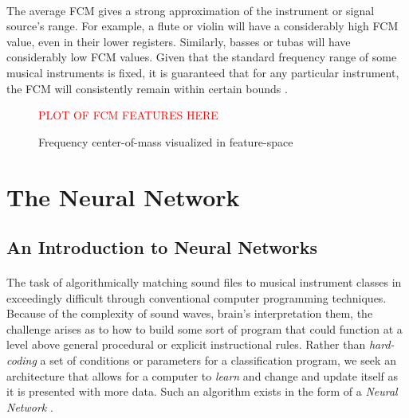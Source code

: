 \documentclass[12pt,letterpaper]{article}
\begin{document}
\paragraph*{}The average FCM gives a strong approximation of the instrument or signal source's range. For example, a flute or violin will have a considerably high FCM value, even in their lower registers. Similarly, basses or tubas will have considerably low FCM values. Given that the standard frequency range of some musical instruments is fixed, it is guaranteed that for any particular instrument, the FCM will consistently remain within certain bounds \cite{Olson,White}.

\begin{figure}[H]
\label{fig-FeatureFCM}
\begin{center}
\textcolor{red}{PLOT OF FCM FEATURES HERE}
\end{center}
\caption{Frequency center-of-mass visualized in feature-space}
\end{figure}



\newpage
\section{The Neural Network}
\label{sec-TheNeuralNetwork}


\subsection{An Introduction to Neural Networks}
\label{subsec-NerualNetworkIntro}

\paragraph*{}The task of algorithmically matching sound files to musical instrument classes in exceedingly difficult through conventional computer programming techniques. Because of the complexity of sound waves, brain's interpretation them, the challenge arises as to how to build some sort of program that could function at a level above general procedural or explicit instructional rules. Rather than \textit{hard-coding} a set of conditions or parameters for a classification program, we seek an architecture that allows for a computer to \textit{learn} and change and update itself as it is presented with more data. Such an algorithm exists in the form of a \textit{Neural Network} \cite{Geron2,Goodfellow,Levine}.
\end{document}
